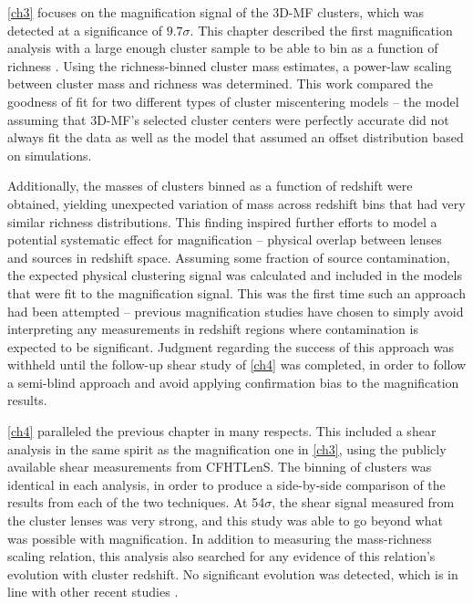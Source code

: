 \autoref{ch3} focuses on the magnification signal of the \ac{3D-MF} clusters, which was detected at a significance of $9.7\sigma$. This chapter described the first magnification analysis with a large enough cluster sample to be able to bin as a function of richness \citep[however, note that the publication of this work was followed in quick succession by a very interesting magnification study of clusters and luminous red galaxies in the \ac{SDSS} by][]{Bauer14}. Using the richness-binned cluster mass estimates, a power-law scaling between cluster mass and richness was determined. This work compared the goodness of fit for two different types of cluster miscentering models -- the model assuming that \ac{3D-MF}'s selected cluster centers were perfectly accurate did not always fit the data as well as the model that assumed an offset distribution based on simulations.

Additionally, the masses of clusters binned as a function of redshift were obtained, yielding unexpected variation of mass across redshift bins that had very similar richness distributions. This finding inspired further efforts to model a potential systematic effect for magnification -- physical overlap between lenses and sources in redshift space. Assuming some fraction of source contamination, the expected physical clustering signal was calculated and included in the models that were fit to the magnification signal. This was the first time such an approach had been attempted -- previous magnification studies have chosen to simply avoid interpreting any measurements in redshift regions where contamination is expected to be significant. Judgment regarding the success of this approach was withheld until the follow-up shear study of \autoref{ch4} was completed, in order to follow a semi-blind approach and avoid applying confirmation bias to the magnification results.

\autoref{ch4} paralleled the previous chapter in many respects. This included a shear analysis in the same spirit as the magnification one in \autoref{ch3}, using the publicly available shear measurements from \ac{CFHTLenS}. The binning of clusters was identical in each analysis, in order to produce a side-by-side comparison of the results from each of the two techniques. At 54$\sigma$, the shear signal measured from the cluster lenses was very strong, and this study was able to go beyond what was possible with magnification. In addition to measuring the mass-richness scaling relation, this analysis also searched for any evidence of this relation's evolution with cluster redshift. No significant evolution was detected, which is in line with other recent studies \citep{Andreon14}. 

